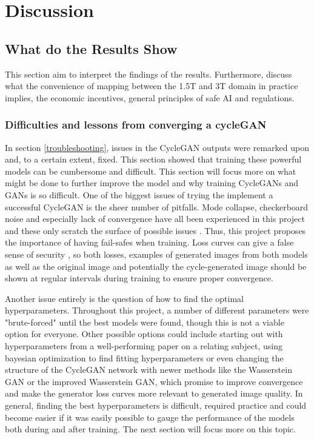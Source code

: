 \documentclass[12pt, fleqn, titlepage]{article}
\newcommand{\1}[1]{\mathds{1}\left[#1\right]}
\begin{document}
\section{Discussion}\label{discussion}

\subsection{What do the Results Show}\label{discussionOfResults}
This section aim to interpret the findings of the results. Furthermore, discuss what the convenience of mapping between the 1.5T and 3T domain in practice implies, the economic incentives, general principles of safe AI and regulations.

\subsubsection{Difficulties and lessons from converging a cycleGAN}
In section \ref{troubleshooting}, issues in the CycleGAN outputs were remarked upon and, to a certain extent, fixed. This section showed that training these powerful models can be cumbersome and difficult. This section will focus more on what might be done to further improve the model and why training CycleGANs and GANs is so difficult. One of the biggest issues of trying the implement a successful CycleGAN is the sheer number of pitfalls. Mode collapse, checkerboard noise and especially lack of convergence have all been experienced in this project and these only scratch the surface of possible issues \cite{hard_to_train, mode_collapse_MLM}. Thus, this project proposes the importance of having fail-safes when training. Loss curves can give a false sense of security \cite{towardsdatascience_losses, better_cycles_losses}, so both losses, examples of generated images from both models as well as the original image and potentially the cycle-generated image should be shown at regular intervals during training to ensure proper convergence.

Another issue entirely is the question of how to find the optimal hyperparameters. Throughout this project, a number of different parameters were "brute-forced" until the best models were found, though this is not a viable option for everyone. Other possible options could include starting out with hyperparameters from a well-performing paper on a relating subject, using bayesian optimization\cite{bayesian_optimization} to find fitting hyperparameters or even changing the structure of the CycleGAN network with newer methods like the Wasserstein GAN\cite{wasserstein_gan} or the improved Wasserstein GAN\cite{wasserstein_gan_improved}, which promise to improve convergence and make the generator loss curves more relevant to generated image quality. In general, finding the best hyperparameters is difficult, required practice and could become easier if it was easily possible to gauge the performance of the models both during and after training. The next section will focus more on this topic.
\end{document}
